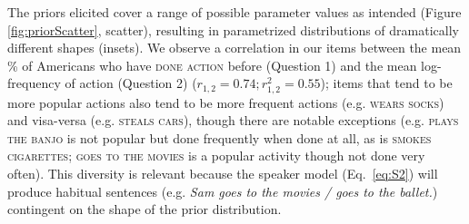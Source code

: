 \documentclass[10pt,letterpaper]{article}
\begin{document}
The priors elicited cover a range of possible parameter values as intended (Figure \ref{fig:priorScatter}, scatter), resulting in parametrized distributions of dramatically different shapes (insets).  
We observe a correlation in our items between the mean \% of Americans who have \textsc{done action} before (Question 1) and the mean log-frequency  of action (Question 2) ($r_{1,2} = 0.74; r^2_{1,2} = 0.55$); items that tend to be more popular actions also tend to be more frequent actions (e.g. \textsc{wears socks}) and visa-versa (e.g. \textsc{steals cars}), though there are notable exceptions (e.g. \textsc{plays the banjo} is not popular but done frequently when done at all, as is \textsc{smokes cigarettes}; \textsc{goes to the movies} is a popular activity though not done very often). 
This diversity is relevant because the speaker model (Eq.~\ref{eq:S2}) will produce habitual sentences (e.g. \emph{Sam goes to the movies / goes to the ballet.}) contingent on the shape of the prior distribution. 
\end{document}
